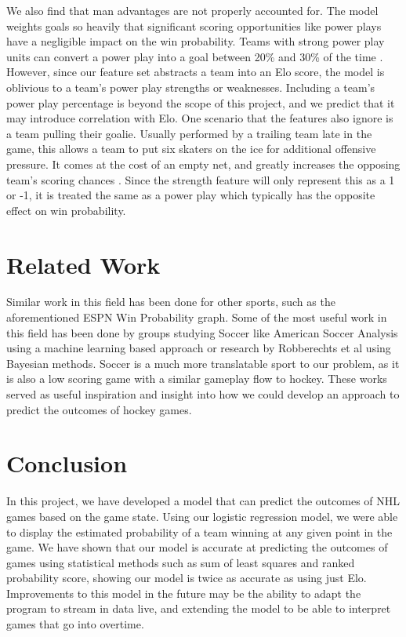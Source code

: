 \documentclass{article}
\begin{document}
We also find that man advantages are not properly accounted for.
The model weights goals so heavily that significant scoring opportunities like power plays have a negligible impact on the win probability.
Teams with strong power play units can convert a power play into a goal between 20\% and 30\% of the time \cite{powerplay}.
However, since our feature set abstracts a team into an Elo score, the model is oblivious to a team's power play strengths or weaknesses.
Including a team's power play percentage is beyond the scope of this project, and we predict that it may introduce correlation with Elo.
One scenario that the features also ignore is a team pulling their goalie.
Usually performed by a trailing team late in the game, this allows a team to put six skaters on the ice for additional offensive pressure.
It comes at the cost of an empty net, and greatly increases the opposing team's scoring chances \cite{goaliepull}.
Since the strength feature will only represent this as a 1 or -1, it is treated the same as a power play which typically has the opposite effect on win probability.

\section{Related Work}
Similar work in this field has been done for other sports, such as the aforementioned ESPN Win Probability graph.
Some of the most useful work in this field has been done by groups studying Soccer like American Soccer Analysis using a 
machine learning based approach \cite{richardett} or research by Robberechts et al \cite{bayesian} using Bayesian methods. Soccer
is a much more translatable sport to our problem, as it is also a low scoring game with a similar gameplay flow to hockey.
These works served as useful inspiration and insight into how we could develop an approach to predict the outcomes of hockey games.

\section{Conclusion}
In this project, we have developed a model that can predict the outcomes of NHL games based on the game state. Using our logistic regression model, we were able to display the estimated probability of 
a team winning at any given point in the game. We have shown that our model is accurate at predicting the outcomes of games using statistical methods such as sum of least squares and ranked probability score,
showing our model is twice as accurate as using just Elo. Improvements to this model in the future may be the ability to adapt the program to stream in data live, and extending the model to be able to interpret games that 
go into overtime.

\nocite{*}


\end{document}
